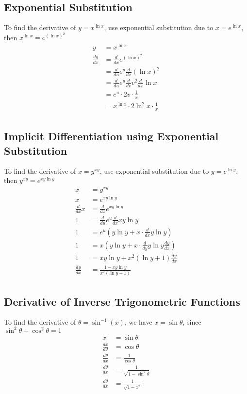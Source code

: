 \documentclass{article}
\begin{document}
\begin{multicols*}{2}
    \subsection*{Exponential Substitution}
    To find the derivative of $y = x^{\ln x}$, use exponential substitution due to $x = e^{\ln x}$, then $x^{\ln x} = e^{(\ln x)^2}$
    \begin{align*}
        y &= x^{\ln x} \\
        \frac{dy}{dx} &= \frac{d}{dx} e^{(\ln x)^2} \\
        &= \frac{d}{du} e^u \frac{d}{dx} (\ln x)^2 \\
        &= \frac{d}{du} e^u \frac{d}{dv} v^2 \frac{d}{dx} \ln x \\
        &= e^u \cdot 2v \cdot \frac{1}{x} \\
        &= x^{\ln x} \cdot 2\ln^2 x \cdot \frac{1}{x} \\
    \end{align*}

    \subsection*{Implicit Differentiation using Exponential Substitution}
    To find the derivative of $x = y^{xy}$, use exponential substitution due to $y = e^{\ln y}$, then $y^{xy} = e^{xy\ln y}$
    \begin{align*}
        x &= y^{xy} \\
        x &= e^{xy\ln y} \\
        \frac{d}{dx} x &= \frac{d}{dx} e^{xy\ln y} \\
        1 &= \frac{d}{du} e^u \frac{d}{dx} xy \ln y \\
        1 &= e^u (y\ln y + x \cdot \frac{d}{dx} y \ln y) \\
        1 &= x (y\ln y + x \cdot \frac{d}{dy} y \ln y \frac{dy}{dx}) \\
        1 &= xy\ln y + x^2(\ln y+1)\frac{dy}{dx} \\
        \frac{dy}{dx} &= \frac{1-xy\ln y}{x^2(\ln y+1)} \\
    \end{align*}

    \subsection*{Derivative of Inverse Trigonometric Functions}
    To find the derivative of $\theta = \sin^{-1}(x)$, we have $x = \sin \theta$, since $\sin^2 \theta + \cos^2 \theta = 1$
    \begin{align*}
        x &= \sin \theta \\
        \frac{dx}{d\theta} &= \cos \theta \\
        \frac{d\theta}{dx} &= \frac{1}{\cos \theta} \\
        \frac{d\theta}{dx} &= \frac{1}{\sqrt{1-\sin^2 \theta}} \\
        \frac{d\theta}{dx} &= \frac{1}{\sqrt{1-x^2}} \\
    \end{align*}


\end{multicols*}
\end{document}
